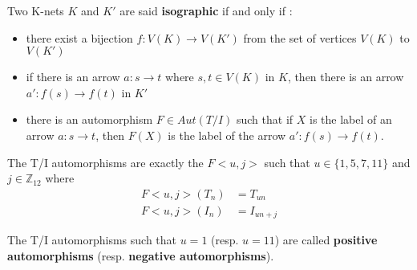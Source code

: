 \begin{defn}
    Two K-nets $K$ and $K'$ are said \textbf{isographic} if and only if :
    \begin{itemize}
        \item there exist a bijection $f:V(K)\rightarrow V(K')$ from the set of vertices $V(K)$ to $V(K')$
        \item if there is an arrow $a:s\rightarrow t$ where $s,t\in V(K)$ in $K$, then there is an arrow $a':f(s)\rightarrow f(t)$ in $K'$
        \item there is an automorphism $F \in Aut(T/I)$\label{nomencl:Aut} such that if $X$ is the label of an arrow $a:s\rightarrow t$, then $F(X)$ is the label of the arrow $a':f(s)\rightarrow f(t)$.
    \end{itemize}
\end{defn}

\begin{prop}
    The T/I automorphisms are exactly the $F\big<u,j\big>$ such that $u\in\{1,5,7,11\}$ and $j\in\mathbb{Z}_{12}$ where
    \begin{align*}
        F\big<u,j\big>(T_n) & = T_{un}   \\
        F\big<u,j\big>(I_n) & = I_{un+j}
    \end{align*}
\end{prop}


\begin{note}
    The T/I automorphisms such that $u = 1$ (resp. $u = 11$) are called \textbf{positive automorphisms} (resp. \textbf{negative automorphisms}).
\end{note}


